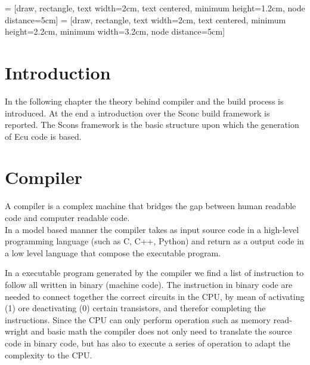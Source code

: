 \documentclass[../main.tex]{subfiles}
\begin{document}
 = [draw, rectangle, text width=2cm, text centered, minimum height=1.2cm, node distance=5cm]
 = [draw, rectangle, text width=2cm, text centered, minimum height=2.2cm, minimum width=3.2cm, node distance=5cm]

\section{Introduction}
In the following chapter the theory behind compiler and the build process is introduced. At the end a introduction over the Sconc build framework is reported. The Scons framework is the basic structure upon which the generation of Ecu code is based. 

\section{Compiler}
A compiler is a complex machine that bridges the gap between human readable code and computer readable code.\\
In a model based manner the compiler takes as input source code in a high-level programming language (such as C, C++, Python) and return as a output code in a low level language that compose the executable program. 
\begin{figure}[H]
  \centering
{}
\end{figure}
In a executable program generated by the compiler we find a list of instruction to follow all written in binary (machine code). The instruction in binary code are needed to connect together the correct circuits in the CPU, by mean of activating (1) ore deactivating (0) certain transistors, and therefor completing the instructions. Since the CPU can only perform operation such as memory read-wright and basic math the compiler does not only need to translate the source code in binary code, but has also to execute a series of operation to adapt the complexity to the CPU. 
\cleardoublepage
\end{document}
